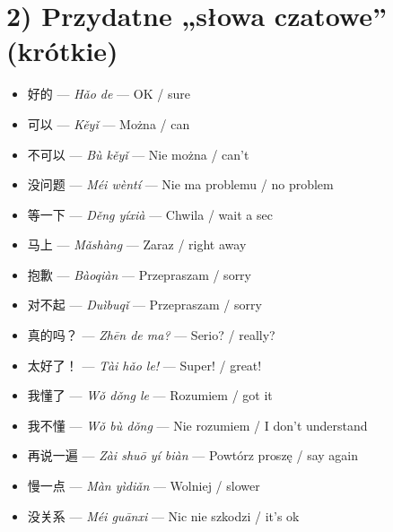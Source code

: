 \documentclass[11pt]{article}
\begin{document}
	\section*{2) Przydatne „słowa czatowe” (krótkie)}
	\begin{itemize}[leftmargin=*, itemsep=3pt]
		\item 好的 — \textit{Hǎo de} — OK / sure
		\item 可以 — \textit{Kěyǐ} — Można / can
		\item 不可以 — \textit{Bù kěyǐ} — Nie można / can’t
		\item 没问题 — \textit{Méi wèntí} — Nie ma problemu / no problem
		\item 等一下 — \textit{Děng yíxià} — Chwila / wait a sec
		\item 马上 — \textit{Mǎshàng} — Zaraz / right away
		\item 抱歉 — \textit{Bàoqiàn} — Przepraszam / sorry
		\item 对不起 — \textit{Duìbuqǐ} — Przepraszam / sorry
		\item 真的吗？ — \textit{Zhēn de ma?} — Serio? / really?
		\item 太好了！ — \textit{Tài hǎo le!} — Super! / great!
		\item 我懂了 — \textit{Wǒ dǒng le} — Rozumiem / got it
		\item 我不懂 — \textit{Wǒ bù dǒng} — Nie rozumiem / I don’t understand
		\item 再说一遍 — \textit{Zài shuō yí biàn} — Powtórz proszę / say again
		\item 慢一点 — \textit{Màn yìdiǎn} — Wolniej / slower
		\item 没关系 — \textit{Méi guānxi} — Nic nie szkodzi / it’s ok
	\end{itemize}
	
\end{document}
